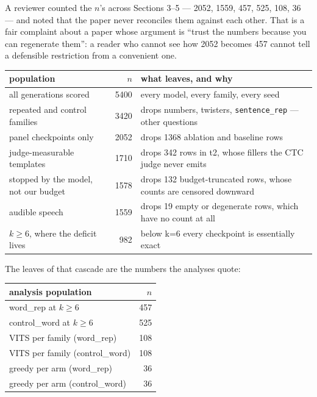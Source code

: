 \documentclass[11pt]{article}
\begin{document}
A reviewer counted the $n$'s across Sections 3--5 --- 2052, 1559, 457, 525, 108,
36 --- and noted that the paper never reconciles them against each other. That is
a fair complaint about a paper whose argument is ``trust the numbers because you
can regenerate them'': a reader who cannot see how 2052 becomes 457 cannot tell a
defensible restriction from a convenient one.

\begin{center}
\begin{tabular}{lrp{6.2cm}}
\toprule
population & $n$ & what leaves, and why \\
\midrule
all generations scored & 5400 & every model, every family, every seed \\
repeated and control families & 3420 & drops numbers, twisters, \texttt{sentence\_rep} --- other questions \\
panel checkpoints only & 2052 & drops 1368 ablation and baseline rows \\
judge-measurable templates & 1710 & drops 342 rows in t2, whose fillers the CTC judge never emits \\
stopped by the model, not our budget & 1578 & drops 132 budget-truncated rows, whose counts are censored downward \\
audible speech & 1559 & drops 19 empty or degenerate rows, which have no count at all \\
$k\ge6$, where the deficit lives & 982 & below k=6 every checkpoint is essentially exact \\
\bottomrule
\end{tabular}
\end{center}

\noindent The leaves of that cascade are the numbers the analyses quote:

\begin{center}
\begin{tabular}{lr}
\toprule
analysis population & $n$ \\
\midrule
word\_rep at $k\ge6$ & 457 \\
control\_word at $k\ge6$ & 525 \\
VITS per family (word\_rep) & 108 \\
VITS per family (control\_word) & 108 \\
greedy per arm (word\_rep) & 36 \\
greedy per arm (control\_word) & 36 \\
\bottomrule
\end{tabular}
\end{center}
\end{document}
